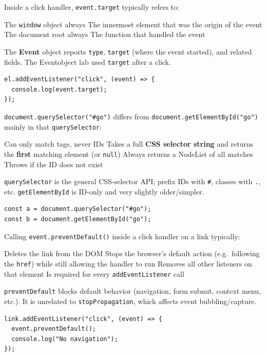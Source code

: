 \newpage

\question[4]
Inside a click handler, \texttt{event.target} typically refers to:
\begin{choices}
  \choice The \texttt{window} object always
  \CorrectChoice The innermost element that was the origin of the event
  \choice The document root always
  \choice The function that handled the event
\end{choices}
\begin{solution}
  The \textbf{Event} object reports \texttt{type}, \texttt{target} (where the event started), and related fields. The Eventobject lab used \texttt{target} after a click.
\begin{lstlisting}[style=js]
el.addEventListener("click", (event) => {
  console.log(event.target);
});
\end{lstlisting}
\end{solution}

\question[4]
\texttt{document.querySelector("\#go")} differs from \texttt{document.getElementById("go")} mainly in that \texttt{querySelector}:
\begin{choices}
  \choice Can only match tags, never IDs
  \CorrectChoice Takes a full \textbf{CSS selector string} and returns the \textbf{first} matching element (or \texttt{null})
  \choice Always returns a NodeList of all matches
  \choice Throws if the ID does not exist
\end{choices}
\begin{solution}
  \texttt{querySelector} is the general CSS-selector API; prefix IDs with \texttt{\#}, classes with \texttt{.}, etc. \texttt{getElementById} is ID-only and very slightly older/simpler.
\begin{lstlisting}[style=js]
const a = document.querySelector("#go");
const b = document.getElementById("go");
\end{lstlisting}
\end{solution}

\question[4]
Calling \texttt{event.preventDefault()} inside a click handler on a link typically:
\begin{choices}
  \choice Deletes the link from the DOM
  \CorrectChoice Stops the browser's default action (e.g.\ following the \texttt{href}) while still allowing the handler to run
  \choice Removes all other listeners on that element
  \choice Is required for every \texttt{addEventListener} call
\end{choices}
\begin{solution}
  \texttt{preventDefault} blocks default behavior (navigation, form submit, context menu, etc.). It is unrelated to \texttt{stopPropagation}, which affects event bubbling/capture.
\begin{lstlisting}[style=js]
link.addEventListener("click", (event) => {
  event.preventDefault();
  console.log("No navigation");
});
\end{lstlisting}
\end{solution}

